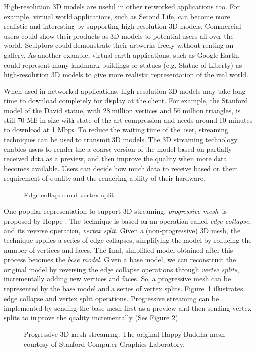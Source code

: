     High-resolution 3D models are useful in other networked applications too. 
    For example, virtual world applications,
    such as Second Life, can become more realistic and interesting by
    supporting high-resolution 3D models. 
    Commercial users could show their products as 3D models to potential users all over 
    the world. Sculptors could demonstrate their artworks freely without renting an gallery.
    As another example, virtual earth applications, 
    such as Google Earth, could represent many landmark buildings or statues
    (e.g. Statue of Liberty) as high-resolution 3D models to
    give more realistic representation of the real world.

    When used in networked applications, 
    high resolution 3D models may take long time to download completely
    for display at the client. 
    For example, the Stanford model of the David statue, with 28 million vertices and
    56 million triangles, is still 70 MB in size with
    state-of-the-art compression \cite{alliez2001progressive} and needs around 10 minutes
    to download at 1 Mbps.  
    To reduce the waiting time of the user, 
    streaming techniques can be used to transmit 3D models. 
    The 3D streaming technology enables users to render the a coarse version of the model
    based on partially received data as a preview, 
    and then improve the quality when more data becomes available. 
    Users can decide how much data to receive based on their requirement of quality
    and the rendering ability of their hardware.

\begin{figure}[htbp!]
\centering
{}
\caption{Edge collapse and vertex split}\label{f:intro:split2}
\end{figure}
    One popular representation to support 3D streaming, \textit{progressive mesh}, 
    is proposed by Hoppe \cite{hoppe96progressive}.
    The technique is based on an
    operation called \textit{edge collapse}, and its reverse
    operation, \textit{vertex split}.  Given a (non-progressive)
    3D mesh, the technique applies a series of edge collapses,
    simplifying the model by reducing the number of vertices and
    faces.  The final, simplified model obtained after this
    process becomes the \textit{base model}.  Given a base model,
    we can reconstruct the original model by reversing
    the edge collapse operations through \textit{vertex splits},
    incrementally adding new vertices and faces. So, a
    progressive mesh can be represented by the base
    model and a series of vertex splits.  
    Figure~\ref{f:intro:split2} illustrates edge
    collapse and vertex split operations.
    Progressive streaming can be implemented by sending the base mesh
    first as a preview and then sending vertex splits to improve 
    the quality incrementally (See Figure \ref{f:intro:progressive}).
    \begin{figure}[htbp!]
    \centering
    \caption{
    Progressive 3D mesh streaming. The original Happy Buddha mesh 
    courtesy of Stanford Computer Graphics Laboratory.
    \label{f:intro:progressive}}
    \end{figure}
    
